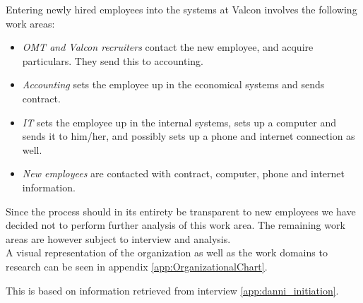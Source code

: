 Entering newly hired employees into the systems at Valcon involves the following work areas:

\begin{itemize}
\item \emph{OMT and Valcon recruiters} contact the new employee, and acquire particulars. They send this to accounting.
\item \emph{Accounting} sets the employee up in the economical systems and sends contract.
\item \emph{IT} sets the employee up in the internal systems, sets up a computer and sends it to him/her, and possibly sets up a phone and internet connection as well.
\item \emph{New employees} are contacted with contract, computer, phone and internet information. 
\end{itemize}

Since the process should in its entirety be transparent to new employees we have decided not to perform further analysis of this work area.
The remaining work areas are however subject to interview and analysis. \\

A visual representation of the organization as well as the work domains to research can be seen in appendix \ref{app:OrganizationalChart}.

This is based on information retrieved from interview \ref{app:danni_initiation}.